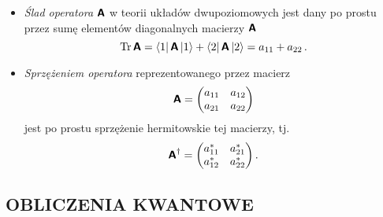 \documentclass{myclass}
\begin{document}
\begin{itemize}
    
    \item \textit{Ślad operatora} \(\boldsymbol{\mathsf{A}}\) w teorii układów dwupoziomowych jest dany po prostu
    przez sumę elementów diagonalnych macierzy \(\boldsymbol{\mathsf{A}}\)
    \begin{equation*}
        \Trace{\oper{A}} = \bra{1}\oper{A}\ket{1} + \bra{2}\oper{A}\ket{2} = a_{11} + a_{22}\,.
    \end{equation*}

    \item \textit{Sprzężeniem operatora} reprezentowanego przez macierz
    \begin{equation*}
        \oper{A} = \mqty(a_{11} & a_{12} \\ a_{21} & a_{22})
    \end{equation*}
    jest po prostu sprzężenie hermitowskie tej macierzy, tj.
    \begin{equation*}
        \oper{A}^\dagger = \mqty(a^*_{11} & a^*_{21} \\ a^*_{12} & a^*_{22})\,.
    \end{equation*}
\end{itemize}


\subsection{OBLICZENIA KWANTOWE}



%
%
%
\end{document}
